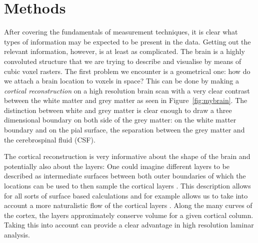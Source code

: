 \section*{Methods}
After covering the fundamentals of measurement techniques, it is clear what types of information may be expected to be present in the data. Getting out the relevant information, however, is at least as complicated. The brain is a highly convoluted structure that we are trying to describe and visualise by means of cubic voxel rasters. The first problem we encounter is a geometrical one: how do we attach a brain location to voxels in space? This can be done by making a \emph{cortical reconstruction} on a high resolution brain scan \cite{Dale1999,Bazin2012} with a very clear contrast between the white matter and grey matter as seen in Figure~\ref{fig:mybrain}. The distinction between white and grey matter is clear enough to draw a three dimensional boundary on both side of the grey matter: on the white matter boundary and on the pial surface, the separation between the grey matter and the cerebrospinal fluid (CSF).


The cortical reconstruction is very informative about the shape of the brain and potentially also about the layers: One could imagine different layers to be described as intermediate surfaces between both outer boundaries of which the locations can be used to then sample the cortical layers \cite{Koopmans2011,Polimeni2010,DeMartino2013}. This description allows for all sorts of surface based calculations \cite{Fischl2000,Bazin2012} and for example allows us to take into account a more naturalistic flow of the cortical layers \cite{Bok1929,Waehnert2014}. Along the many curves of the cortex, the layers approximately conserve volume for a given cortical column. Taking this into account can provide a clear advantage in high resolution laminar analysis.

